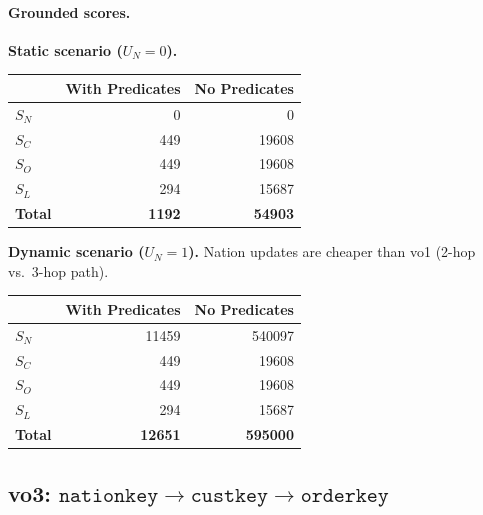 \paragraph{Grounded scores.}

\smallskip
\noindent\textbf{Static scenario ($U_N = 0$).}
\begin{center}
\begin{tabular}{lrr}
\toprule
& With Predicates & No Predicates \\
\midrule
$S_N$ & 0 & 0 \\
$S_C$ & 449 & 19608 \\
$S_O$ & 449 & 19608 \\
$S_L$ & 294 & 15687 \\
\midrule
\textbf{Total} & \textbf{1192} & \textbf{54903} \\
\bottomrule
\end{tabular}
\end{center}

\smallskip
\noindent\textbf{Dynamic scenario ($U_N = 1$).}
Nation updates are cheaper than vo1 (2-hop vs.\ 3-hop path).
\begin{center}
\begin{tabular}{lrr}
\toprule
& With Predicates & No Predicates \\
\midrule
$S_N$ & 11459 & 540097 \\
$S_C$ & 449 & 19608 \\
$S_O$ & 449 & 19608 \\
$S_L$ & 294 & 15687 \\
\midrule
\textbf{Total} & \textbf{12651} & \textbf{595000} \\
\bottomrule
\end{tabular}
\end{center}

\subsection{vo3: $\texttt{nationkey} \rightarrow \texttt{custkey} \rightarrow \texttt{orderkey}$}


